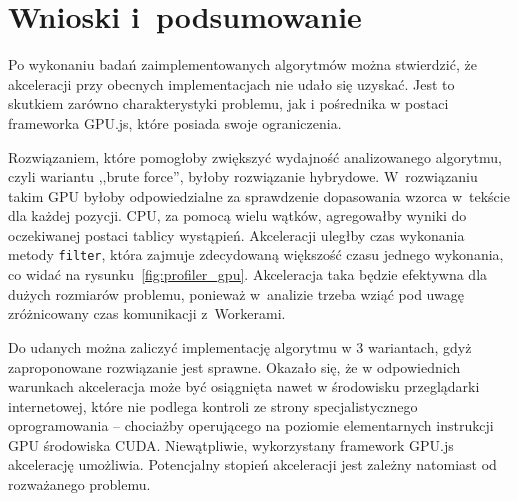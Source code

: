 \section{Wnioski i~podsumowanie}

Po wykonaniu badań zaimplementowanych algorytmów można stwierdzić, że akceleracji przy obecnych implementacjach nie udało się uzyskać. Jest to skutkiem zarówno charakterystyki problemu, jak i pośrednika w postaci frameworka GPU.js, które posiada swoje ograniczenia.

Rozwiązaniem, które pomogłoby zwiększyć wydajność analizowanego algorytmu, czyli wariantu ,,brute force'', byłoby rozwiązanie hybrydowe. W~rozwiązaniu takim GPU byłoby odpowiedzialne za sprawdzenie dopasowania wzorca w~tekście dla każdej pozycji. CPU, za pomocą wielu wątków, agregowałby wyniki do oczekiwanej postaci tablicy wystąpień. Akceleracji uległby czas wykonania metody \texttt{filter}, która zajmuje zdecydowaną większość czasu jednego wykonania, co widać na rysunku~\ref{fig:profiler_gpu}. Akceleracja taka będzie efektywna dla dużych rozmiarów problemu, ponieważ w~analizie trzeba wziąć pod uwagę zróżnicowany czas komunikacji z~Workerami.

Do udanych można zaliczyć implementację algorytmu w 3 wariantach, gdyż zaproponowane rozwiązanie jest sprawne. Okazało się, że w odpowiednich warunkach akceleracja może być osiągnięta nawet w środowisku przeglądarki internetowej, które nie podlega kontroli ze strony specjalistycznego oprogramowania -- chociażby operującego na poziomie elementarnych instrukcji GPU środowiska CUDA. Niewątpliwie, wykorzystany framework GPU.js akcelerację umożliwia. Potencjalny stopień akceleracji jest zależny natomiast od rozważanego problemu.